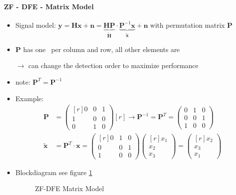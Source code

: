 \documentclass[a4paper, 10pt]{article}
\begin{document}
\paragraph{ZF - DFE - Matrix Model}
\begin{itemize}
	\item Signal model: $ \mathbf{y} = \mathbf{Hx} + \mathbf{n} = \underbrace{\mathbf{HP}}_{\tilde{\mathbf{H}}}\cdot\underbrace{\mathbf{P}^{-1}\mathbf{x}}_{\tilde{\mathbf{x}}} + \mathbf{n} $ with permutation matrix $\mathbf{P} $
	\item $\mathbf{P} $ has one \grqq\, per column and row, all other elements are \grqq 
	\item[$\rightarrow$] can change the detection order to maximize performance
	\item note: $\mathbf{P}^T = \mathbf{P}^{-1} $
	\item Example: 
	\begin{align*}
		\mathbf{P} &= \begin{pmatrix*}[r] 0 & 0 & 1\\1 & 0 & 0\\ 0 & 1 & 0	\end{pmatrix*}[r] \rightarrow \mathbf{P}^{-1} = \mathbf{P}^T = \begin{pmatrix*}0 & 1 & 0\\0 & 0 & 1\\ 1 & 0 & 0\end{pmatrix*}\\
		\tilde{\mathbf{x}} &= \mathbf{P}^T\cdot\mathbf{x} = \begin{pmatrix*}[r] 0 & 1 & 0\\ 0 & 0 & 1\\ 1 & 0 & 0\end{pmatrix*}\begin{pmatrix*}[r]x_1 \\x_2\\x_3\end{pmatrix*} = \begin{pmatrix*}[r]x_2\\x_3\\x_1\end{pmatrix*}
	\end{align*}
	\item Blockdiagram see figure \ref{ZF-DFE-Matrix}
	\begin{figure}
		\centering
		\resizebox{\textwidth}{!}{}
		\caption{ZF-DFE Matrix Model}
		\label{ZF-DFE-Matrix}
	\end{figure}

\end{itemize}
\end{document}
